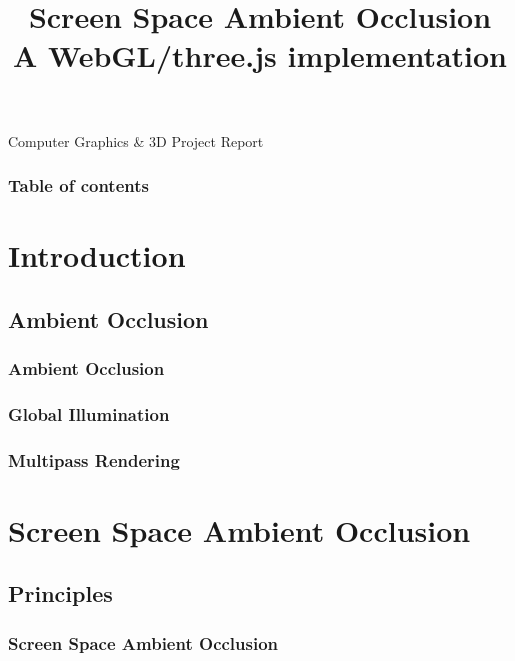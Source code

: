 \documentclass{beamer}
\title[]{Screen Space Ambient Occlusion \\\small A WebGL/three.js implementation}
\author[Ivan Prosperi]{
    \usebox{\authbox}}
\institute[]{Universit\`a degli Studi di Firenze}
\date{}
\begin{document}
\begin{frame}
    \titlepage
    \centering
    \vspace*{-1.3cm}
    Computer Graphics \& 3D Project Report
\end{frame}

\begin{frame}
    \frametitle{Table of contents}
    \tableofcontents
\end{frame}

\section{Introduction}

\subsection{Ambient Occlusion}

\begin{frame}
\frametitle{Ambient Occlusion}

\end{frame}

\begin{frame}
\frametitle{Global Illumination}

\end{frame}

\begin{frame}
\frametitle{Multipass Rendering}

\end{frame}

\section{Screen Space Ambient Occlusion}

\subsection{Principles}

\begin{frame}
\frametitle{Screen Space Ambient Occlusion}

\end{frame}
\end{document}
